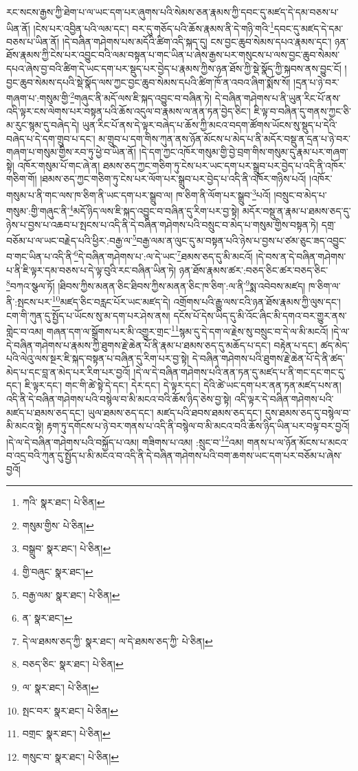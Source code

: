 རང་སངས་རྒྱས་ཀྱི་ཐེག་པ་ལ་ཡང་དག་པར་ཞུགས་པའི་སེམས་ཅན་རྣམས་ཀྱི་དབང་དུ་མཛད་དེ་དམ་བཅས་པ་ཡིན་ནོ། །ངེས་པར་འབྱིན་པའི་ལམ་དང་། བར་དུ་གཅོད་པའི་ཆོས་རྣམས་ནི་དེ་གཉི་གའི་\footnote{ཀའི་  སྣར་ཐང་།  པེ་ཅིན། }དབང་དུ་མཛད་དེ་དམ་བཅས་པ་ཡིན་ནོ། །དེ་བཞིན་གཤེགས་པས་མདོའི་ཚིག་འདི་སྐད་དུ། ངས་བྱང་ཆུབ་སེམས་དཔའ་རྣམས་དང་། ཉན་ཐོས་རྣམས་ཀྱི་ངེས་པར་འབྱུང་བའི་ལམ་བསྟན་པ་གང་ཡིན་པ་ཞེས་རྒྱས་པར་གསུངས་པ་ལས་བྱང་ཆུབ་སེམས་དཔའ་ཞེས་བྱ་བའི་ཚིག་དེ་ཡང་དག་པར་སྡུད་པར་བྱེད་པ་རྣམས་ཀྱིས་ཉན་ཐོས་ཀྱི་སྡེ་སྣོད་ཀྱི་སྐབས་ནས་བྱུང་ངོ། །བྱང་ཆུབ་སེམས་དཔའི་སྡེ་སྣོད་ལས་ཀྱང་བྱང་ཆུབ་སེམས་དཔའི་ཚིག་ཁོ་ན་འབའ་ཞིག་སྨོས་སོ། །དྲན་པ་ཉེ་བར་གཞག་པ་:གསུམ་གྱི་\footnote{གསུམ་གྱིས་  པེ་ཅིན། }གཞུང་ནི་མདོ་ལས་ཇི་སྐད་འབྱུང་བ་བཞིན་ཏེ། དེ་བཞིན་གཤེགས་པ་ནི་ཡུན་རིང་པོ་ནས་འདི་ལྟར་ངས་ལེགས་པར་བསྟན་པའི་ཆོས་འདུལ་བ་རྣམས་ལ་ནན་ཏན་བྱེད་ཅིང་། ཇི་ལྟ་བ་བཞིན་དུ་གནས་ཀྱང་ཅི་མ་རུང་སྙམ་དུ་བཞེད་དེ། ཡུན་རིང་པོ་ནས་དེ་ལྟར་བཞེད་པ་ཆོས་ཀྱི་མངའ་བདག་ཚོགས་ཡོངས་སུ་སྡུད་པ་དེའི་བཞེད་པ་དེ་དག་གྲུབ་པ་དང་། མ་གྲུབ་པ་དག་གིས་ཀུན་ནས་ཉོན་མོངས་པ་མེད་པ་ནི་མདོར་བསྡུ་ན་དྲན་པ་ཉེ་བར་གཞག་པ་གསུམ་གྱིས་རབ་ཏུ་ཕྱེ་བ་ཡིན་ནོ། །དེ་དག་ཀྱང་འཁོར་གསུམ་གྱི་བྱེ་བྲག་གིས་གསུམ་དུ་རྣམ་པར་གཞག་སྟེ། འཁོར་གསུམ་པོ་གང་ཞེ་ན། ཐམས་ཅད་ཀྱང་གཅིག་ཏུ་ངེས་པར་ཡང་དག་པར་སྒྲུབ་པར་བྱེད་པ་འདི་ནི་འཁོར་གཅིག་གོ། །ཐམས་ཅད་ཀྱང་གཅིག་ཏུ་ངེས་པར་ལོག་པར་སྒྲུབ་པར་བྱེད་པ་འདི་ནི་འཁོར་གཉིས་པའོ། །འཁོར་གསུམ་པ་ནི་གང་ལས་ཁ་ཅིག་ནི་ཡང་དག་པར་སྒྲུབ་ལ། ཁ་ཅིག་ནི་ལོག་པར་སྒྲུབ་\footnote{བསྒྲུབ་  སྣར་ཐང་།  པེ་ཅིན། }པའོ། །བསྲུང་བ་མེད་པ་གསུམ་:གྱི་གཞུང་ནི་\footnote{གྱི་བཞུང་  སྣར་ཐང་། }མདོ་ཉིད་ལས་ཇི་སྐད་འབྱུང་བ་བཞིན་དུ་རིག་པར་བྱ་སྟེ། མདོར་བསྡུ་ན་རྣམ་པ་ཐམས་ཅད་དུ་ཉེས་པ་བྱས་པ་འཆབ་པ་སྤངས་པ་འདི་ནི་དེ་བཞིན་གཤེགས་པའི་བསྲུང་བ་མེད་པ་གསུམ་གྱིས་བསྟན་ཏེ། དགྲ་བཅོམ་པ་ལ་ཡང་བརྗེད་པའི་ཕྱིར་:བརྒྱ་ལ་\footnote{བརྒྱ་ལམ་  སྣར་ཐང་།  པེ་ཅིན། }བརྒྱ་ལམ་ན་ལུང་དུ་མ་བསྟན་པའི་ཉེས་པ་བྱས་པ་ཙམ་ཅུང་ཟད་འབྱུང་བ་གང་ཡིན་པ་འདི་ནི་\footnote{ན་  སྣར་ཐང་། }དེ་བཞིན་གཤེགས་པ་:ལ་དེ་ཡང་\footnote{དེ་ལ་ཐམས་ཅད་ཀྱི་  སྣར་ཐང་། ལ་དེ་ཐམས་ཅད་ཀྱི་  པེ་ཅིན། }ཐམས་ཅད་དུ་མི་མངའོ། །དེ་བས་ན་དེ་བཞིན་གཤེགས་པ་ནི་ཇི་ལྟར་དམ་བཅས་པ་དེ་ལྟ་བུའི་རང་བཞིན་ཡིན་ཏེ། ཉན་ཐོས་རྣམས་ཚར་:བཅད་ཅིང་ཚར་བཅད་ཅིང་\footnote{བཅད་ཅིང་  སྣར་ཐང་།  པེ་ཅིན། }བཀའ་སྩལ་ཏོ། །ཐིབས་ཀྱིས་མནན་ཅིང་ཐིབས་ཀྱིས་མནན་ཅིང་ཁ་ཅིག་:ལ་ནི་\footnote{ལ་  སྣར་ཐང་།  པེ་ཅིན། }སྨ་འབེབས་མཛད། ཁ་ཅིག་ལ་ནི་:སྤངས་པར་\footnote{སྤང་བར་  སྣར་ཐང་།  པེ་ཅིན། }མཛད་ཅིང་བརླང་པོར་ཡང་མཛད་དེ། འགྲོགས་པའི་རྒྱུ་ལས་ངའི་ཉན་ཐོས་རྣམས་ཀྱི་ལུས་དང་། ངག་གི་ཀུན་དུ་སྤྱོད་པ་ཡོངས་སུ་མ་དག་པར་ཤེས་ནས། དངོས་པོ་དེས་ཡིད་དུ་མི་འོང་ཞིང་མི་དགའ་བར་གྱུར་ནས་གླེང་བ་འམ། གཞན་དག་ལ་སྒྲོགས་པར་མི་འགྱུར་གྲང་\footnote{བགྲང་  སྣར་ཐང་།  པེ་ཅིན། }སྙམ་དུ་དེ་དག་ལ་རྗེས་སུ་བསྲུང་བ་དེ་ལ་མི་མངའོ། །དེ་ལ་དེ་བཞིན་གཤེགས་པ་རྣམས་ཀྱི་ཐུགས་རྗེ་ཆེན་པོ་ནི་རྣམ་པ་ཐམས་ཅད་དུ་མཆོད་པ་དང་། བརྟེན་པ་དང་། ཚད་མེད་པའི་ལེའུ་ལས་སྔར་ཇི་སྐད་བསྟན་པ་བཞིན་དུ་རིག་པར་བྱ་སྟེ། དེ་བཞིན་གཤེགས་པའི་ཐུགས་རྗེ་ཆེན་པོ་དེ་ནི་ཚད་མེད་པ་དང་བླ་ན་མེད་པར་རིག་པར་བྱའོ། །དེ་ལ་དེ་བཞིན་གཤེགས་པའི་ནན་ཏན་དུ་མཛད་པ་ནི་གང་དང་གང་དུ་དང་། ཇི་ལྟར་དང་། གང་གི་ཚེ་སྟེ་དེ་དང་། དེར་དང་། དེ་ལྟར་དང་། དེའི་ཚེ་ཡང་དག་པར་ནན་ཏན་མཛད་པས་ན། འདི་ནི་དེ་བཞིན་གཤེགས་པའི་བསྙེལ་བ་མི་མངའ་བའི་ཆོས་ཉིད་ཅེས་བྱ་སྟེ། འདི་ལྟར་དེ་བཞིན་གཤེགས་པའི་མཛད་པ་ཐམས་ཅད་དང་། ཡུལ་ཐམས་ཅད་དང་། མཛད་པའི་ཐབས་ཐམས་ཅད་དང་། དུས་ཐམས་ཅད་དུ་བསྙེལ་བ་མི་མངའ་སྟེ། རྟག་ཏུ་དགོངས་པ་ཉེ་བར་གནས་པ་འདི་ནི་བསྙེལ་བ་མི་མངའ་བའི་ཆོས་ཉིད་ཡིན་པར་བལྟ་བར་བྱའོ། །དེ་ལ་དེ་བཞིན་གཤེགས་པའི་བསྐྱོད་པ་འམ། གཟིགས་པ་འམ། :སྲུང་བ་\footnote{གསུང་བ་  སྣར་ཐང་།  པེ་ཅིན། }འམ། གནས་པ་ལ་ཉོན་མོངས་པ་མངའ་བ་འདྲ་བའི་ཀུན་དུ་སྤྱོད་པ་མི་མངའ་བ་འདི་ནི་དེ་བཞིན་གཤེགས་པའི་བག་ཆགས་ཡང་དག་པར་བཅོམ་པ་ཞེས་བྱའོ། 